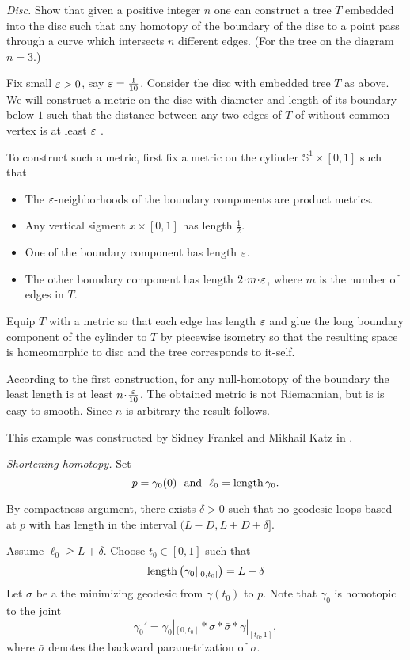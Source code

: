 \textit{Disc.}
Show that given a positive integer $n$ one can construct a tree $T$ embedded into the disc such that any homotopy of the boundary of the disc to a point pass through a curve which intersects $n$ different edges.
(For the tree on the diagram $n=3$.)


Fix small $\varepsilon>0$, say $\varepsilon=\tfrac1{10}$.
Consider the disc with embedded tree $T$ as above.
We will construct a metric on the disc 
with diameter and length of its boundary below $1$
such that 
the distance between any two edges of $T$ of without common vertex 
is at least $\varepsilon$ .

To construct such a metric, first fix a metric on the cylinder $\mathbb S^1\times [0,1]$ such that 
\begin{itemize}
\item The $\varepsilon$-neighborhoods of the boundary components are product metrics.
\item Any vertical sigment $x\times[0,1]$ has length $\tfrac 12$.
\item One of the boundary component has length $\varepsilon$.
\item The other boundary component has length $2\cdot m\cdot \eps$, 
where $m$ is the number of edges in $T$.
\end{itemize}
Equip $T$ with a metric so that each edge has length $\varepsilon$
and glue the long boundary component of the cylinder to $T$ by piecewise isometry so that the resulting space is homeomorphic to disc and the tree corresponds to it-self.

According to the first construction,
for any null-homotopy of the boundary 
the least length is at least $n\cdot\tfrac{\eps}{10}$.
The obtained metric is not Riemannian, but is is easy to smooth.
Since $n$ is arbitrary the result follows.

This example was constructed by Sidney Frankel and Mikhail Katz in \cite{frankel-katz}.
 

\textit{Shortening homotopy.}
Set 
\[p=\gamma_0(0)\ \ \text{and}\ \  \ell_0=\length\gamma_0.\]

By compactness argument,
there exists $\delta>0$ 
such that no geodesic loops based at $p$ with has length in the interval $(L-D, L+D+\delta]$. 

Assume $\ell_0\ge L+\delta$.
Choose $t_0\in [0,1]$ such that
\[\operatorname{\rm length}\left(\gamma_0|_{[0,t_0]}\right)=L+\delta\]
Let $\sigma$ be a the minimizing geodesic from $\gamma(t_0)$
to $p$.
Note that $\gamma_0$ is homotopic to the joint 
\[\gamma_0'=\gamma_0|_{[0,t_0]}*\sigma*\bar\sigma*\gamma|_{[t_0,1]},\]
where $\bar\sigma$ denotes the backward parametrization of $\sigma$.

